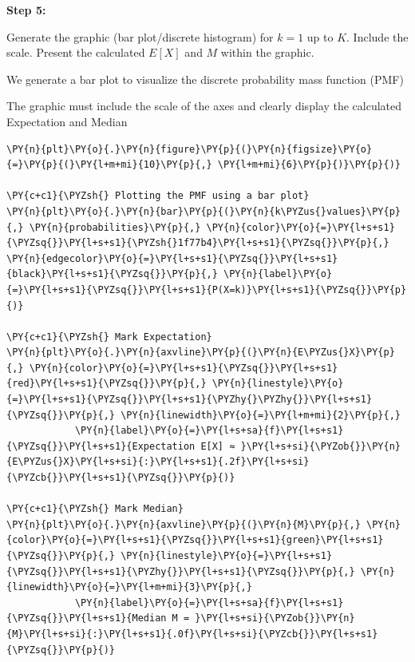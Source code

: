     \textbf{Step 5:}

Generate the graphic (bar plot/discrete histogram) for \(k=1\) up to
\(K\). Include the scale. Present the calculated \(E[X]\) and \(M\)
within the graphic.

We generate a bar plot to visualize the discrete probability mass
function (PMF) \cite{con:coursebook}

The graphic must include the scale of the axes and clearly display the
calculated Expectation and Median

    \begin{tcolorbox}[breakable, size=fbox, boxrule=1pt, pad at break*=1mm,colback=cellbackground, colframe=cellborder]
\begin{Verbatim}[commandchars=\\\{\}]
\PY{n}{plt}\PY{o}{.}\PY{n}{figure}\PY{p}{(}\PY{n}{figsize}\PY{o}{=}\PY{p}{(}\PY{l+m+mi}{10}\PY{p}{,} \PY{l+m+mi}{6}\PY{p}{)}\PY{p}{)}

\PY{c+c1}{\PYZsh{} Plotting the PMF using a bar plot}
\PY{n}{plt}\PY{o}{.}\PY{n}{bar}\PY{p}{(}\PY{n}{k\PYZus{}values}\PY{p}{,} \PY{n}{probabilities}\PY{p}{,} \PY{n}{color}\PY{o}{=}\PY{l+s+s1}{\PYZsq{}}\PY{l+s+s1}{\PYZsh{}1f77b4}\PY{l+s+s1}{\PYZsq{}}\PY{p}{,} \PY{n}{edgecolor}\PY{o}{=}\PY{l+s+s1}{\PYZsq{}}\PY{l+s+s1}{black}\PY{l+s+s1}{\PYZsq{}}\PY{p}{,} \PY{n}{label}\PY{o}{=}\PY{l+s+s1}{\PYZsq{}}\PY{l+s+s1}{P(X=k)}\PY{l+s+s1}{\PYZsq{}}\PY{p}{)}

\PY{c+c1}{\PYZsh{} Mark Expectation}
\PY{n}{plt}\PY{o}{.}\PY{n}{axvline}\PY{p}{(}\PY{n}{E\PYZus{}X}\PY{p}{,} \PY{n}{color}\PY{o}{=}\PY{l+s+s1}{\PYZsq{}}\PY{l+s+s1}{red}\PY{l+s+s1}{\PYZsq{}}\PY{p}{,} \PY{n}{linestyle}\PY{o}{=}\PY{l+s+s1}{\PYZsq{}}\PY{l+s+s1}{\PYZhy{}\PYZhy{}}\PY{l+s+s1}{\PYZsq{}}\PY{p}{,} \PY{n}{linewidth}\PY{o}{=}\PY{l+m+mi}{2}\PY{p}{,}
            \PY{n}{label}\PY{o}{=}\PY{l+s+sa}{f}\PY{l+s+s1}{\PYZsq{}}\PY{l+s+s1}{Expectation E[X] ≈ }\PY{l+s+si}{\PYZob{}}\PY{n}{E\PYZus{}X}\PY{l+s+si}{:}\PY{l+s+s1}{.2f}\PY{l+s+si}{\PYZcb{}}\PY{l+s+s1}{\PYZsq{}}\PY{p}{)}

\PY{c+c1}{\PYZsh{} Mark Median}
\PY{n}{plt}\PY{o}{.}\PY{n}{axvline}\PY{p}{(}\PY{n}{M}\PY{p}{,} \PY{n}{color}\PY{o}{=}\PY{l+s+s1}{\PYZsq{}}\PY{l+s+s1}{green}\PY{l+s+s1}{\PYZsq{}}\PY{p}{,} \PY{n}{linestyle}\PY{o}{=}\PY{l+s+s1}{\PYZsq{}}\PY{l+s+s1}{\PYZhy{}}\PY{l+s+s1}{\PYZsq{}}\PY{p}{,} \PY{n}{linewidth}\PY{o}{=}\PY{l+m+mi}{3}\PY{p}{,}
            \PY{n}{label}\PY{o}{=}\PY{l+s+sa}{f}\PY{l+s+s1}{\PYZsq{}}\PY{l+s+s1}{Median M = }\PY{l+s+si}{\PYZob{}}\PY{n}{M}\PY{l+s+si}{:}\PY{l+s+s1}{.0f}\PY{l+s+si}{\PYZcb{}}\PY{l+s+s1}{\PYZsq{}}\PY{p}{)}


\end{Verbatim}
\end{tcolorbox}
